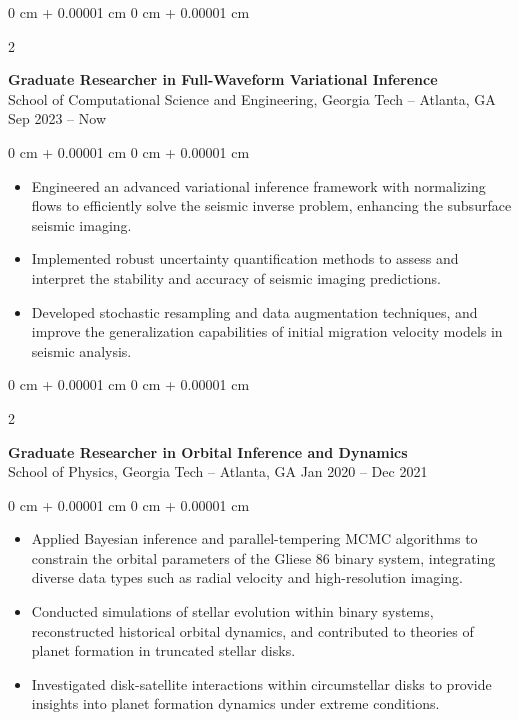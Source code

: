 \documentclass[10pt, letterpaper]{article}
\newenvironment{highlights}{
    \begin{itemize}[
        topsep=0.10 cm,
        parsep=0.10 cm,
        partopsep=0pt,
        itemsep=0pt,
        leftmargin=0 cm + 10pt
    ]
}{
    \end{itemize}
} %
\newenvironment{onecolentry}{
    \begin{adjustwidth}{
        0 cm + 0.00001 cm
    }{
        0 cm + 0.00001 cm
    }
}{
    \end{adjustwidth}
} %
\newenvironment{twocolentry}[2][]{
    \onecolentry
    \def\secondColumn{#2}
    \setcolumnwidth{\fill, 4.5 cm}
    \begin{paracol}{2}
}{
    \switchcolumn \raggedleft \secondColumn
    \end{paracol}
    \endonecolentry
} %
\begin{document}
        
        \begin{twocolentry}{
            Sep 2023 – Now
        }
            \textbf{Graduate Researcher in Full-Waveform Variational Inference} \\ School of Computational Science and Engineering, Georgia Tech -- Atlanta, GA\end{twocolentry}

        \vspace{0.10 cm}
        \begin{onecolentry}
            \begin{highlights}
                \item Engineered an advanced variational inference framework with normalizing flows to efficiently solve the seismic inverse problem, enhancing the subsurface seismic imaging.
                \item Implemented robust uncertainty quantification methods to assess and interpret the stability and accuracy of seismic imaging predictions.
                \item Developed stochastic resampling and data augmentation techniques, and improve the generalization capabilities of initial migration velocity models in seismic analysis.
            \end{highlights}
        \end{onecolentry}


        \vspace{0.2 cm}

        \begin{twocolentry}{
            Jan 2020 – Dec 2021
        }
            \textbf{Graduate Researcher in Orbital Inference and Dynamics} \\ School of Physics, Georgia Tech -- Atlanta, GA\end{twocolentry}

        \vspace{0.10 cm}
        \begin{onecolentry}
            \begin{highlights}
                \item Applied Bayesian inference and parallel-tempering MCMC algorithms to constrain the orbital parameters of the Gliese 86 binary system, integrating diverse data types such as radial velocity and high-resolution imaging.
                \item Conducted simulations of stellar evolution within binary systems, reconstructed historical orbital dynamics, and contributed to theories of planet formation in truncated stellar disks.
                \item Investigated disk-satellite interactions within circumstellar disks to provide insights into planet formation dynamics under extreme conditions.
            \end{highlights}
        \end{onecolentry}
\end{document}
